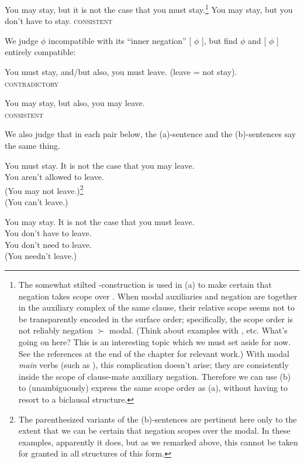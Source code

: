 \pex \a You may stay, but it is not the case that you must stay.\footnote{The
  somewhat stilted -construction is used in (a)
  to make certain that negation takes scope over . When modal
  auxiliaries and negation are together in the auxiliary complex of the same
  clause, their relative scope seems not to be transparently encoded in the
  surface order; specifically, the scope order is not reliably negation $\succ$
  modal. (Think about examples with ,  etc. What's going on here? This is an interesting topic
  which we must set aside for now. See the references at the end of the chapter
  for relevant work.) With modal \emph{main} verbs (such as ), this complication doesn't arise; they are consistently inside the
  scope of clause-mate auxiliary negation. Therefore we can use (b) to
  (unambiguously) express the same scope order as (a), without having to resort
  to a biclausal structure.} \a You may stay, but you don't have to stay.
\hfill\textsc{consistent} \xe

We judge  $\phi$ incompatible with its ``inner negation''
 [ $\phi$ ], but find  $\phi$
and  [ $\phi$ ] entirely compatible:

\ex You must stay, and/but also, you must leave. (leave = not stay).\\
\null\hfill\textsc{contradictory} \xe

\ex You may stay, but also, you may leave. \\
\null\hfill\textsc{consistent} \xe

We also judge that in each pair below, the (a)-sentence and the (b)-sentences
say the same thing.

\pex \a You must stay. \a It is not the case that you may leave.\\
You aren't allowed to leave.\\
(You may not leave.)\footnote{The parenthesized variants of the (b)-sentences are pertinent here only to the extent that we can be certain that negation scopes over the modal. In these examples, apparently it does, but as we remarked above, this cannot be taken for granted in all structures of this form.}\\
(You can't leave.) \xe

\pex \a You may stay. \a It is not the case that you must leave.\\
You don't have to leave.\\
You don't need to leave.\\
(You needn't leave.)
\xe

